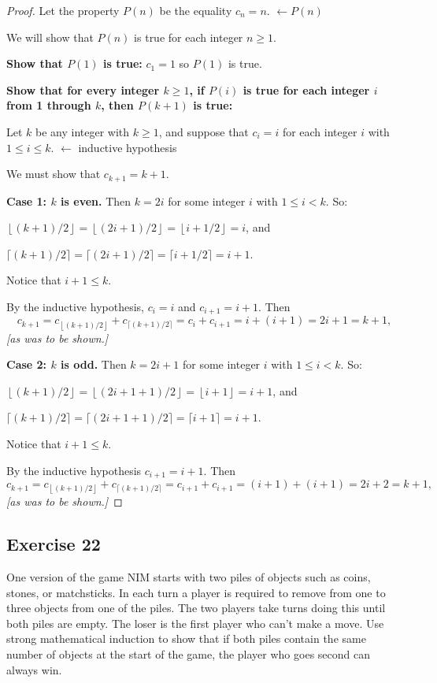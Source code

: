 \documentclass[14pt]{extarticle}
\newcommand{\dps}{\displaystyle}
\newcommand{\from}{\leftarrow}
\newcommand{\floor}[1]{{\left\lfloor#1\right\rfloor}}
\newcommand{\ceil}[1]{{\lceil#1\rceil}}
\newcommand{\cy}{\color{cyan}}
\begin{document}
\begin{proof}
Let the property $P(n)$ be the equality $c_n = n$. {\cy $\from P(n)$} 

We will show that $P(n)$ is true for each integer $n \geq 1$. 

{\bf Show that $P(1)$ is true:} 
$c_1 = 1$ so $P(1)$ is true.

{\bf Show that for every integer $k \geq 1$, if $P(i)$ is
true for each integer $i$ from 1 through $k$, then $P(k + 1)$ is true:}

Let $k$ be any integer with $k \geq 1$, and suppose that
$c_i = i$ for each integer $i$ with $1 \leq i \leq k$.
{\cy $\from$ inductive hypothesis}

We must show that $c_{k+1} = k+1$. 

{\bf Case 1: $k$ is even.} 
Then $k = 2i$ for some integer $i$ with $1 \leq i < k$. So: 

$\dps \floor{(k+1)/2} = \floor{(2i+1)/2} = \floor{i+1/2} = i$, and

$\dps \ceil{(k+1)/2} = \ceil{(2i+1)/2} = \ceil{i+1/2} = i+1$.

Notice that $i + 1 \leq k$.

By the inductive hypothesis, $c_i = i$ and $c_{i+1} = i+1$. Then
\[
c_{k+1} = c_{\floor{(k+1)/2}} + c_{\ceil{(k+1)/2}} = c_i + c_{i+1} = i + (i+1) = 2i+1 = k+1,
\]
{\it [as was to be shown.]}

{\bf Case 2: $k$ is odd.} 
Then $k = 2i + 1$ for some integer $i$ with $1 \leq i < k$. So: 

$\dps \floor{(k + 1)/2} = \floor{(2i + 1 + 1)/2} = \floor{i + 1} = i + 1$, and

$\dps \ceil{(k + 1)/2} = \ceil{(2i + 1 + 1)/2} = \ceil{i + 1} = i+1$.

Notice that $i + 1 \leq k$.

By the inductive hypothesis $c_{i+1} = i+1$. Then
\[
c_{k + 1} = c_{\floor{(k+1)/2}} + c_{\ceil{(k+1)/2}} = c_{i + 1} + c_{i + 1} = (i+1) + (i+1) = 2i+2 = k+1,
\]
{\it [as was to be shown.]}
\end{proof}

\subsection{Exercise 22}
One version of the game NIM starts with two piles of
objects such as coins, stones, or matchsticks. In each turn
a player is required to remove from one to three objects
from one of the piles. The two players take turns doing
this until both piles are empty. The loser is the first
player who can’t make a move. Use strong mathematical
induction to show that if both piles contain the same
number of objects at the start of the game, the player who 
goes second can always win.
\end{document}
